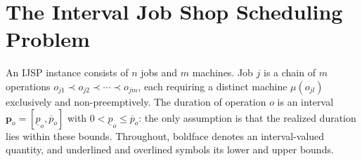 \documentclass[preprint,number,sort&compress,12pt]{elsarticle}
\begin{document}
\section{The Interval Job Shop Scheduling Problem}
\label{sec:problem}

An IJSP instance consists of $n$ jobs and $m$ machines. Job $j$ is a
chain of $m$ operations $o_{j1} \prec o_{j2} \prec \cdots \prec o_{jm}$,
each requiring a distinct machine $\mu(o_{jl})$ exclusively and
non-preemptively. The duration of operation $o$ is an interval
$\mathbf{p}_o = [\underline{p}_o, \overline{p}_o]$ with
$0 < \underline{p}_o \le \overline{p}_o$: the only assumption is that the
realized duration lies within these bounds. Throughout, boldface
denotes an interval-valued quantity, and underlined and overlined
symbols its lower and upper bounds.
\end{document}
